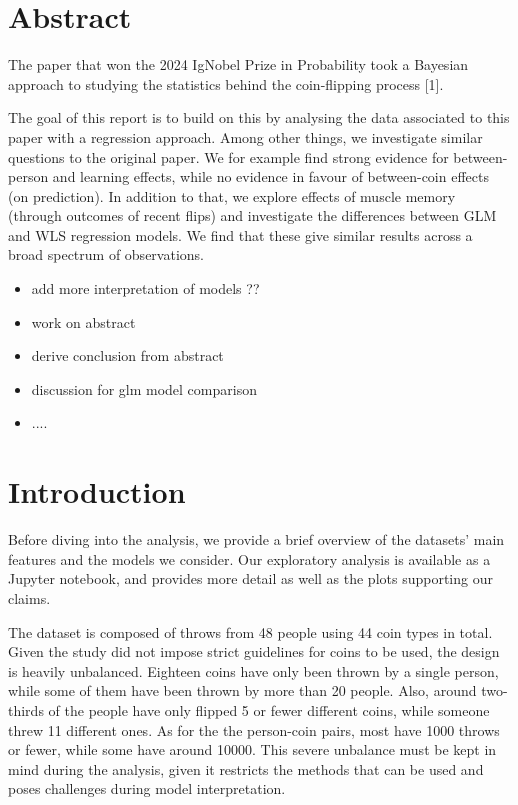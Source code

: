\documentclass[a4paper, 12pt,oneside]{article}
\begin{document}
 
	 
	\clearpage
	\tableofcontents
	\thispagestyle{empty}
	\vspace{2cm}
	\section*{Abstract}
		The paper that won the 2024 IgNobel Prize in Probability took a Bayesian approach to studying the statistics behind the coin-flipping process [1]. 

		The goal of this report is to build on this by analysing the data associated to this paper with a regression approach. Among other things, we investigate similar questions to the original paper. We for example find strong evidence for between-person and learning effects, while no evidence in favour of between-coin effects (on prediction). In addition to that, we explore effects of muscle memory (through outcomes of recent flips) and investigate the differences between GLM and WLS regression models. We find that these give similar results across a broad spectrum of observations. 
		\begin{itemize}
			\item add more interpretation of models ?? 
			\item work on abstract
			\item derive conclusion from abstract 
			\item discussion for glm model comparison
			\item ....
		\end{itemize}
	\clearpage
	\setcounter{page}{1}
	\section{Introduction}
		Before diving into the analysis, we provide a brief overview of the datasets' main features and the models we consider. Our exploratory analysis is available as a Jupyter notebook, and provides more detail as well as the plots supporting our claims.

		The dataset is composed of throws from 48 people using 44 coin types in total. Given the study did not impose strict guidelines for coins to be used, the design is heavily unbalanced. Eighteen coins have only been thrown by a single person, while some of them have been thrown by more than 20 people. Also, around two-thirds of the people have only flipped 5 or fewer different coins, while someone threw 11 different ones. As for the the person-coin pairs, most have 1000 throws or fewer, while some have around 10000. This severe unbalance must be kept in mind during the analysis, given it restricts the methods that can be used and poses challenges during model interpretation. 
\end{document}
